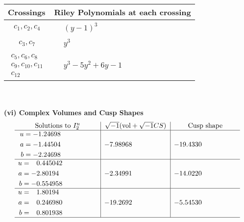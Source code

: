 \documentclass[1p]{elsarticle_modified}
\theoremstyle{definition}
\newcommand{\I}{\sqrt{-1}}
\begin{document}
\begin{tabular}{m{50pt}|m{274pt}}
Crossings & \hspace{64pt}Riley Polynomials at each crossing \\
\hline $$\begin{aligned}c_{1},c_{2},c_{4}\end{aligned}$$&$\begin{aligned}
&(y-1)^3
\end{aligned}$\\
\hline $$\begin{aligned}c_{3},c_{7}\end{aligned}$$&$\begin{aligned}
&y^3
\end{aligned}$\\
\hline $$\begin{aligned}c_{5},c_{6},c_{8}\\c_{9},c_{10},c_{11}\\c_{12}\end{aligned}$$&$\begin{aligned}
&y^3-5 y^2+6 y-1
\end{aligned}$\\
\hline
\end{tabular}\\~\\
\newpage\flushleft \textbf{(vi) Complex Volumes and Cusp Shapes}
$$\begin{array}{c|c|c}  
\text{Solutions to }I^u_{2}& \I (\text{vol} + \sqrt{-1}CS) & \text{Cusp shape}\\
 \hline 
\begin{aligned}
u &= -1.24698\phantom{ +0.000000I} \\
a &= -1.44504\phantom{ +0.000000I} \\
b &= -2.24698\phantom{ +0.000000I}\end{aligned}
 & -7.98968\phantom{ +0.000000I} & -19.4330\phantom{ +0.000000I} \\ \hline\begin{aligned}
u &= \phantom{-}0.445042\phantom{ +0.000000I} \\
a &= -2.80194\phantom{ +0.000000I} \\
b &= -0.554958\phantom{ +0.000000I}\end{aligned}
 & -2.34991\phantom{ +0.000000I} & -14.0220\phantom{ +0.000000I} \\ \hline\begin{aligned}
u &= \phantom{-}1.80194\phantom{ +0.000000I} \\
a &= \phantom{-}0.246980\phantom{ +0.000000I} \\
b &= \phantom{-}0.801938\phantom{ +0.000000I}\end{aligned}
 & -19.2692\phantom{ +0.000000I} & -5.54530\phantom{ +0.000000I}\\
 \hline 
 \end{array}$$\newpage\newpage\renewcommand{\arraystretch}{1}
\end{document}
